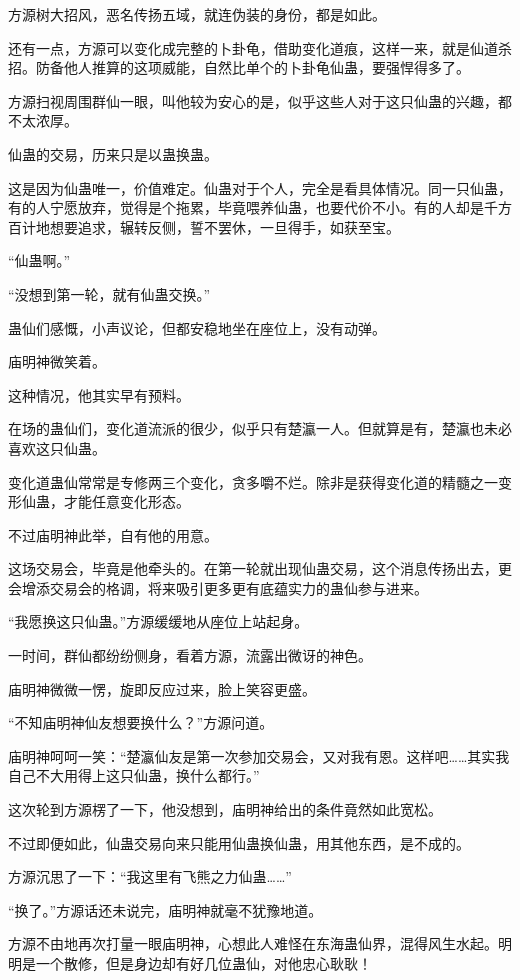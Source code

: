 \begin{this_body}
方源树大招风，恶名传扬五域，就连伪装的身份，都是如此。

还有一点，方源可以变化成完整的卜卦龟，借助变化道痕，这样一来，就是仙道杀招。防备他人推算的这项威能，自然比单个的卜卦龟仙蛊，要强悍得多了。

方源扫视周围群仙一眼，叫他较为安心的是，似乎这些人对于这只仙蛊的兴趣，都不太浓厚。

仙蛊的交易，历来只是以蛊换蛊。

这是因为仙蛊唯一，价值难定。仙蛊对于个人，完全是看具体情况。同一只仙蛊，有的人宁愿放弃，觉得是个拖累，毕竟喂养仙蛊，也要代价不小。有的人却是千方百计地想要追求，辗转反侧，誓不罢休，一旦得手，如获至宝。

“仙蛊啊。”

“没想到第一轮，就有仙蛊交换。”

蛊仙们感慨，小声议论，但都安稳地坐在座位上，没有动弹。

庙明神微笑着。

这种情况，他其实早有预料。

在场的蛊仙们，变化道流派的很少，似乎只有楚瀛一人。但就算是有，楚瀛也未必喜欢这只仙蛊。

变化道蛊仙常常是专修两三个变化，贪多嚼不烂。除非是获得变化道的精髓之一变形仙蛊，才能任意变化形态。

不过庙明神此举，自有他的用意。

这场交易会，毕竟是他牵头的。在第一轮就出现仙蛊交易，这个消息传扬出去，更会增添交易会的格调，将来吸引更多更有底蕴实力的蛊仙参与进来。

“我愿换这只仙蛊。”方源缓缓地从座位上站起身。

一时间，群仙都纷纷侧身，看着方源，流露出微讶的神色。

庙明神微微一愣，旋即反应过来，脸上笑容更盛。

“不知庙明神仙友想要换什么？”方源问道。

庙明神呵呵一笑：“楚瀛仙友是第一次参加交易会，又对我有恩。这样吧……其实我自己不大用得上这只仙蛊，换什么都行。”

这次轮到方源楞了一下，他没想到，庙明神给出的条件竟然如此宽松。

不过即便如此，仙蛊交易向来只能用仙蛊换仙蛊，用其他东西，是不成的。

方源沉思了一下：“我这里有飞熊之力仙蛊……”

“换了。”方源话还未说完，庙明神就毫不犹豫地道。

方源不由地再次打量一眼庙明神，心想此人难怪在东海蛊仙界，混得风生水起。明明是一个散修，但是身边却有好几位蛊仙，对他忠心耿耿！


\end{this_body}
